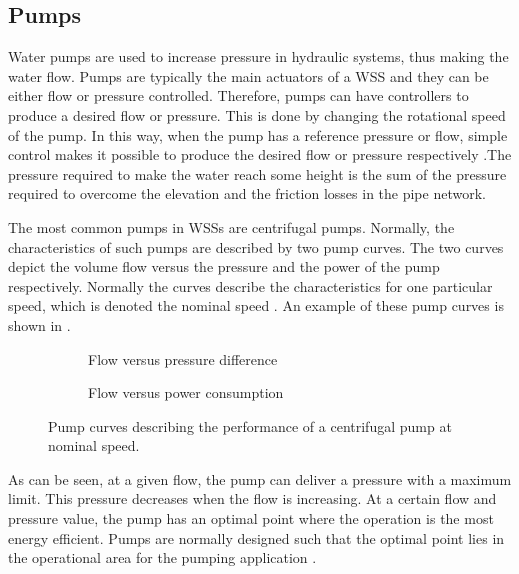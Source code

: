 \subsection{Pumps}
\label{pumps}

Water pumps are used to increase pressure in hydraulic systems, thus making the water flow. Pumps are typically the main actuators of a WSS and they can be either flow or pressure controlled. Therefore, pumps can have controllers to produce a desired flow or pressure. This is done by changing the rotational speed of the pump. In this way, when the pump has a reference pressure or flow, simple control makes it possible to produce the desired flow or pressure respectively \cite{kallesoePHD}.The pressure required to make the water reach some height is the sum of the pressure required to overcome the elevation and the friction losses in the pipe network. 

The most common pumps in WSSs are centrifugal pumps. Normally, the characteristics of such pumps are described by two pump curves. The two curves depict the volume flow versus the pressure and the power of the pump respectively. Normally the curves describe the characteristics for one particular speed, which is denoted the nominal speed \cite{kallesoePHD}. An example of these pump curves is shown in .

\begin{figure}[H]
\centering
\begin{subfigure}{.49\textwidth}
\centering
   
  \caption{Flow versus pressure difference}
  \label{fig:sub1}
\end{subfigure}
\begin{subfigure}{.49\textwidth}
\centering
   
  \caption{Flow versus power consumption}
  \label{fig:sub2}
\end{subfigure}
\caption{Pump curves describing the performance of a centrifugal pump at nominal speed.}
\label{fig:pump_curves}
\end{figure}

%  

As can be seen, at a given flow, the pump can deliver a pressure with a maximum limit. This pressure decreases when the flow is increasing. At a certain flow and pressure value, the pump has an optimal point where the operation is the most energy efficient. Pumps are normally designed such that the optimal point lies in the operational area for the pumping application \cite{kenneth_houe}. 


